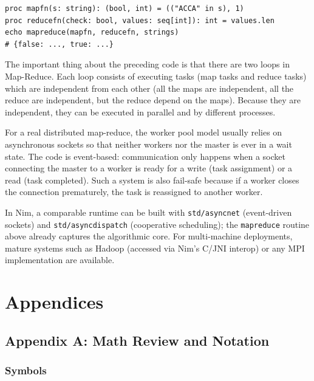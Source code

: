 \documentclass[justified, sixbynine]{tufte-book}
\def\ft{\small\tt}
\theoremstyle{plain}%
\newtheorem * {corollary}{Corollary}
\theoremstyle{definition}
\theoremstyle{remark}
\newtheorem * {remark}{Remark}
\newtheorem * {note}{Note}
\begin{document}
\begin{fullwidth}
\begin{lstlisting}
proc mapfn(s: string): (bool, int) = (("ACCA" in s), 1)
proc reducefn(check: bool, values: seq[int]): int = values.len
echo mapreduce(mapfn, reducefn, strings)
# {false: ..., true: ...}
\end{lstlisting}

The important thing about the preceding code is that there are two loops in Map-Reduce. Each loop consists of executing tasks (map tasks and reduce tasks) which are independent from each other (all the maps are independent, all the reduce are independent, but the reduce depend on the maps). Because they are independent, they can be executed in parallel and by different processes.

For a real distributed map-reduce, the worker pool model usually relies on asynchronous sockets so that neither workers nor the master is ever in a wait state. The code is event-based: communication only happens when a socket connecting the master to a worker is ready for a write (task assignment) or a read (task completed). Such a system is also fail-safe because if a worker closes the connection prematurely, the task is reassigned to another worker.

In Nim, a comparable runtime can be built with {\ft std/asyncnet} (event-driven sockets) and {\ft std/asyncdispatch} (cooperative scheduling); the {\ft mapreduce} routine above already captures the algorithmic core. For multi-machine deployments, mature systems such as Hadoop (accessed via Nim's C/JNI interop) or any MPI implementation are available.


\chapter{Appendices}

\goodbreak\section{Appendix A: Math Review and Notation}

\goodbreak\subsection{Symbols}


\end{fullwidth}
\end{document}
